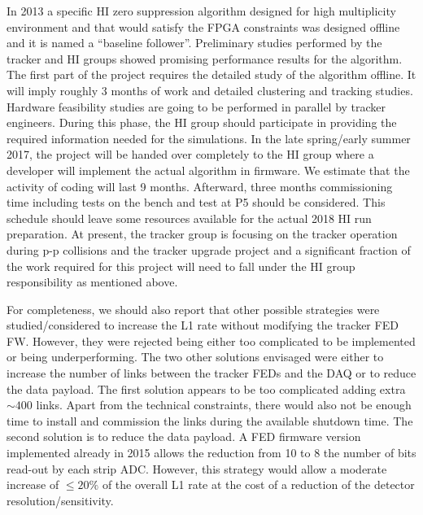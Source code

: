 In 2013 a specific HI zero suppression algorithm designed for high multiplicity environment and that would satisfy the FPGA constraints was designed offline and it is named a ``baseline follower''.  Preliminary studies performed by the tracker and HI groups showed promising performance results for the algorithm. The first part of the project requires the detailed study of the algorithm offline. It will imply roughly 3 months of work and detailed clustering and tracking studies. Hardware feasibility studies are going to be performed in parallel by tracker engineers. During this phase, the HI group should participate in providing the required information needed for the simulations. In the late spring/early summer 2017, the project will be handed over completely to the HI group where a developer will implement the actual algorithm in firmware. We estimate that the activity of coding will last 9 months. Afterward, three months commissioning time including tests on the bench and test at P5 should be considered. This schedule should leave some resources available for the actual 2018 HI run preparation. At present, the tracker group is focusing on the tracker operation during p-p collisions and the tracker upgrade project and a significant fraction of the work required for this project will need to fall under the HI group responsibility as mentioned above. 


For completeness, we should also report that other possible strategies were studied/considered to increase the L1 rate without modifying the tracker FED FW. However, they were rejected being either too complicated to be implemented or being underperforming. The two other solutions envisaged were either to increase the number of links between the tracker FEDs and the DAQ or to reduce the data payload. The first solution appears to be too complicated adding extra $\sim 400$ links. Apart from the technical constraints, there would also not be enough time to install and commission the links during the available shutdown time. The second solution is to reduce the data payload. A FED firmware version implemented already in 2015 allows the reduction from 10 to 8 the number of bits read-out by each strip ADC. However, this strategy would allow a moderate increase of $\le 20 \%$ of the overall L1 rate at the cost of a reduction of the detector resolution/sensitivity. 
